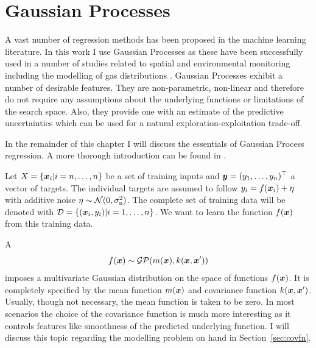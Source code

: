 \chapter{Gaussian Processes}
A vast number of regression methods has been proposed in the machine learning 
literature. In this work I use Gaussian Processes as these have been 
successfully used in a number of studies related to spatial and environmental 
monitoring including the modelling of gas distributions 
\parencite[e.\,g.][]{Stranders:2008wl, Marchant:2012wb, Stachniss:2008vz}.  
Gaussian Processes exhibit a number of desirable features. They are 
non-parametric, non-linear and therefore do not require any assumptions about 
the underlying functions or limitations of the search space.  Also, they provide 
one with an estimate of the predictive uncertainties which can be used for 
a natural exploration-exploitation trade-off.

In the remainder of this chapter I will discuss the essentials of Gaussian 
Process regression. A more thorough introduction can be found in 
\textcite{Rasmussen:2006vz}.

Let $X = \{\bm{x}_i | i = n, \dots, n\}$ be a set of training inputs and $\bm{y} = (y_1, \dots, y_n)^{\top}$ a vector of targets. The individual targets are 
assumed to follow $y_i = f(\bm{x}_i) + \eta$ with additive noise $\eta \sim 
\mathcal{N}(0, \sigma_{\mathrm{n}}^2)$. The complete set of training data will be 
denoted with $\mathcal{D} = \{(\bm{x}_i, y_i) | i = 1, \dots, n\}$. We want to 
learn the function $f(\bm{x})$ from this training data.

A 
\begin{equation}
    f(\bm{x}) \sim \mathcal{GP}(m(\bm{x}), k(\bm{x}, \bm{x}'))
\end{equation}
imposes a multivariate Gaussian distribution on the space of functions $f(\bm{x})$. It is completely specified by the mean function $m(\bm{x})$ and covariance 
function $k(\bm{x}, \bm{x}')$. Usually, though not necessary, the mean function is 
taken to be zero. In most scenarios the choice of the covariance function is 
much more interesting as it controls features like smoothness of the predicted 
underlying function. I will discuss this topic regarding the modelling problem 
on hand in Section~\ref{sec:covfn}.

